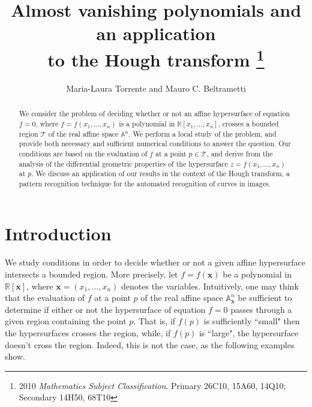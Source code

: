 \documentclass[10pt]{article}
\newcommand\MA{{\mathbb A}}
\newcommand\reals{{\mathbb R}}
\newcommand{\x}{{\bm x}}
\begin{document}
\title{Almost vanishing polynomials and an  application \\  to the Hough transform
\footnote{2010
{\em Mathematics Subject Classification}. Primary  26C10, 15A60, 14Q10;
Secondary 14H50, 68T10 \newline
{} }}
\author{ Maria-Laura Torrente and Mauro C. Beltrametti }

\date{}
\maketitle




\begin{abstract}
We consider the problem of deciding whether or not 
an affine hypersurface of equation $f=0$, where 
$f=f(x_1,\ldots,x_n)$ is a polynomial in $\reals[x_1,\ldots,x_n]$, 
crosses a bounded region $\mathcal T$ of the 
real affine space $\MA^n$. We perform a local study of the problem, 
and provide both necessary and sufficient numerical conditions 
to answer the question. Our conditions are based 
on  the evaluation of $f$ at a point $p \in \mathcal T$, 
and derive from the analysis of the differential geometric properties of the 
hypersurface $z=f(x_1,\ldots,x_n)$ at $p$.
We  discuss an application of our results in the context of  the Hough transform,
 a pattern recognition technique  for the automated recognition of curves in images.

\end{abstract}



\maketitle


\section*{Introduction}


We study conditions in order to decide 
whether or not a given affine hypersurface intersects a bounded region. More precisely, let $f=f({\x})$ be a polynomial in $\reals[{\x}]$, where ${\x}=(x_1,\ldots,x_n)$ denotes the variables. Intuitively, one may think that the evaluation of  $f$ at a point $p$ of the real affine space ${\mathbb A}_{\x}^n$ be sufficient to determine if either or not the hypersurface of equation $f=0$ passes through a given region containing the point $p$. That is, if $f(p)$ is sufficiently ``small"  then the hypersurfaces crosses the region, while, if $f(p)$ is ``large", the hypersurface doesn't cross the region. Indeed, this is   not the case, as the following examples show.
\end{document}
